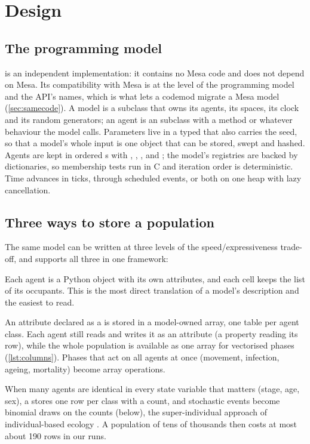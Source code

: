 \section{Design}
\label{sec:design}

\subsection{The programming model}

\modelly{} is an independent implementation: it contains no Mesa code and does not depend on
Mesa. Its compatibility with Mesa is at the level of the programming model and the API's
names, which is what lets a codemod migrate a Mesa model (\cref{sec:samecode}).
A \modelly{} model is a  subclass that owns its agents, its spaces, its clock and
its random generators; an agent is an  subclass with a  method or
whatever behaviour the model calls. Parameters live in a typed  that also
carries the seed, so that a model's whole input is one object that can be stored, swept and
hashed. Agents are kept in ordered s with , ,
,  and ; the model's registries are backed by
dictionaries, so membership tests run in C and iteration order is deterministic. Time advances
in ticks, through scheduled events, or both on one heap with lazy cancellation.

\subsection{Three ways to store a population}
\label{sec:storage}

The same model can be written at three levels of the speed/expressiveness trade-off, and
\modelly{} supports all three in one framework:

\begin{description}[style=nextline,leftmargin=1.5em,itemsep=2pt]
  \item[Objects (the per-agent style of Mesa).] Each agent is a Python object with its own attributes, and each
  cell keeps the list of its occupants. This is the most direct translation of a model's
  description and the easiest to read.
  \item[Columns.] An attribute declared as a  is stored in a model-owned
   array, one table per agent class. Each agent still reads and writes it as an
  attribute (a property reading its row), while the whole population is available as one array
  for vectorised phases (\cref{lst:columns}). Phases that act on all agents at once (movement,
  infection, ageing, mortality) become array operations.
  \item[Cohorts.] When many agents are identical in every state variable that matters (stage,
  age, sex), a  stores one row per class with a count, and stochastic events
  become binomial draws on the counts (below), the super-individual approach of
  individual-based ecology \citep{scheffer1995super}. A population of tens of thousands then
  costs at most about 190 rows in our runs.
\end{description}

